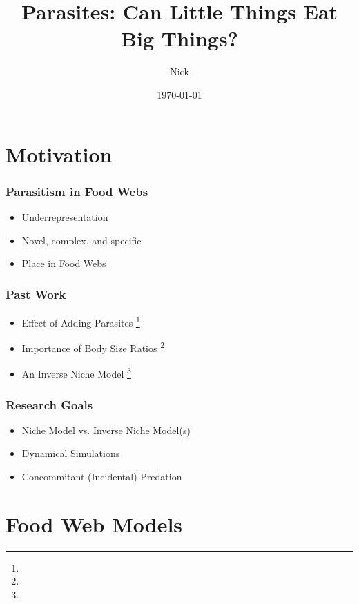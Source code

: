 \documentclass{beamer}
\title{Parasites: Can Little Things Eat Big Things?}
\author{Nick}
\date{\today}
\begin{document}
\frame{\titlepage}

\frame{\tableofcontents}

\section{Motivation}

\begin{frame}
\frametitle{Parasitism in Food Webs}
\begin{itemize}[<+->]
\item  Underrepresentation
\item  Novel, complex, and specific
\item  Place in Food Webs
\end{itemize}
\end{frame}

\begin{frame}
\frametitle{Past Work}
\begin{itemize}[<+->]
\item  Effect of Adding Parasites \footnote{\tiny{}}
\item  Importance of Body Size Ratios \footnote{\tiny{}}
\item  An Inverse Niche Model \footnote{\tiny{}}
\end{itemize}
\end{frame}

\begin{frame}
\frametitle{Research Goals}
\begin{itemize}[<+->]
\item Niche Model vs. Inverse Niche Model(s)
\item  Dynamical Simulations
\item  Concommitant (Incidental) Predation
\end{itemize}
\end{frame}


\section{Food Web Models}
\end{document}
